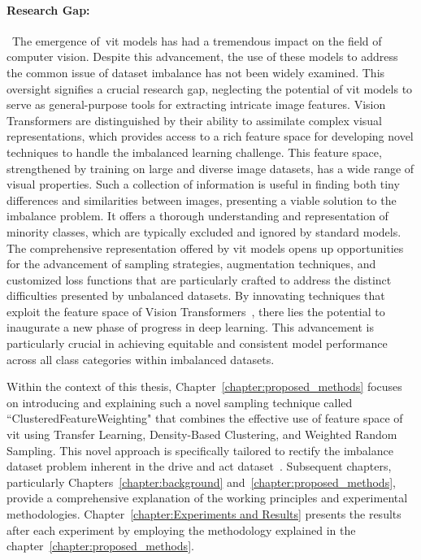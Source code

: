 \paragraph{Research Gap:}~The emergence of~\gls{vit} models has had a tremendous impact on the field of computer vision. Despite this advancement, the use of these models to address the common issue of dataset imbalance has not been widely examined. This oversight signifies a crucial research gap, neglecting the potential of \gls{vit} models to serve as general-purpose tools for extracting intricate image features. Vision Transformers are distinguished by their ability to assimilate complex visual representations, which provides access to a rich feature space for developing novel techniques to handle the imbalanced learning challenge. This feature space, strengthened by training on large and diverse image datasets, has a wide range of visual properties. Such a collection of information is useful in finding both tiny differences and similarities between images, presenting a viable solution to the imbalance problem. It offers a thorough understanding and representation of minority classes, which are typically excluded and ignored by standard models. The comprehensive representation offered by \gls{vit} models opens up opportunities for the advancement of sampling strategies, augmentation techniques, and customized loss functions that are particularly crafted to address the distinct difficulties presented by unbalanced datasets. By innovating techniques that exploit the feature space of Vision Transformers~\citep{Vit_Paper_Dosovitskiy2020AnII}, there lies the potential to inaugurate a new phase of progress in deep learning. This advancement is particularly crucial in achieving equitable and consistent model performance across all class categories within imbalanced datasets.


Within the context of this thesis, Chapter~\ref{chapter:proposed_methods} focuses on introducing and explaining such a novel sampling technique called ``ClusteredFeatureWeighting" that combines the effective use of feature space of \gls{vit} using Transfer Learning, Density-Based Clustering, and Weighted Random Sampling. This novel approach is specifically tailored to rectify the imbalance dataset problem inherent in the drive and act dataset~\citep{martin2019drive_and_act_2019_iccv}. Subsequent chapters, particularly Chapters~\ref{chapter:background} and~\ref{chapter:proposed_methods}, provide a comprehensive explanation of the working principles and experimental methodologies. Chapter~\ref{chapter:Experiments and Results} presents the results after each experiment by employing the methodology explained in the chapter~\ref{chapter:proposed_methods}.



